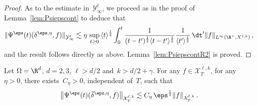 \begin{proof}
\goodbreak
As to the estimate in~$\mathcal{Y}^\ell_\infty$, we proceed as in the proof of Lemma~\ref{lem:Psiepscont} to deduce that
\[
\|\Psi^\eps(t) (\delta^{\eps,\eta},f) \|_{\mathcal{Y}^{\ell}_\infty} \lesssim \eta \, \sup_{t \ge 0} \, \langle t \rangle^{\frac14} \int_0^t \frac{1}{(t-t')^\frac12 \langle t-t' \rangle^\frac12} \frac{1}{\langle t' \rangle^\frac12} \, \dt' \|f\|_{L^\infty(\R^+,X^{\ell,k})} \,,
\]
and the result follows directly as above. Lemma~\ref{lem:PsiepscontR2} is proved.
\end{proof}

\begin{lemm}\label{lem:Psiepsbardelta}
Let $\Omega= \R^d$, $d=2,3$, $\ell>d/2$ and~${k>d/2+\gamma}$. For any $f \in \mathcal{X}^{\ell,k}_T$, for any~$\eta>0$, there exists~$C_\eta>0$, independent of~$T$, such that
\[
\left\|\Psi^\eps(t)(\bar \delta^{\eps,\eta},f)\right\|_{\mathcal{X}^{\ell,k}_T} \lesssim C_\eta \, \eps^\frac12 \|f\|_{\mathcal{X}^{\ell,k}_T} \,.
\]
\end{lemm}
